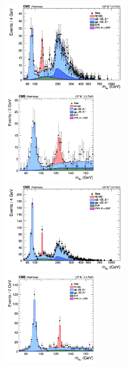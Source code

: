 {%
\begin{figure}[!htb]
	\vspace*{0.3cm}
	\begin{center}
		\includegraphics[width=0.56\textwidth]{Figures/KinDistr/M4lMain_Unblinded_4e_InclusiveRun2.png}
		\includegraphics[width=0.43\textwidth]{Figures/KinDistr/M4lMainZoomed_Unblinded_4e_InclusiveRun2.png}\\
		\includegraphics[width=0.56\textwidth]{Figures/KinDistr/M4lMain_Unblinded_4mu_InclusiveRun2.png}
		\includegraphics[width=0.43\textwidth]{Figures/KinDistr/M4lMainZoomed_Unblinded_4mu_InclusiveRun2.png}\\

\end{center}
\end{figure}}
